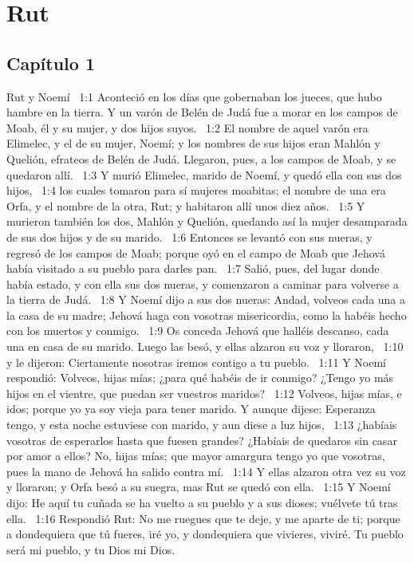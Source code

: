 \chapter{Rut}

\section*{Capítulo 1}

Rut y Noemí  
1:1 Aconteció en los días que gobernaban los jueces, que hubo hambre en la tierra. Y un varón de Belén de Judá fue a morar en los campos de Moab, él y su mujer, y dos hijos suyos.  
1:2 El nombre de aquel varón era Elimelec, y el de su mujer, Noemí; y los nombres de sus hijos eran Mahlón y Quelión, efrateos de Belén de Judá. Llegaron, pues, a los campos de Moab, y se quedaron allí.  
1:3 Y murió Elimelec, marido de Noemí, y quedó ella con sus dos hijos,  
1:4 los cuales tomaron para sí mujeres moabitas; el nombre de una era Orfa, y el nombre de la otra, Rut; y habitaron allí unos diez años.  
1:5 Y murieron también los dos, Mahlón y Quelión, quedando así la mujer desamparada de sus dos hijos y de su marido.  
1:6 Entonces se levantó con sus nueras, y regresó de los campos de Moab; porque oyó en el campo de Moab que Jehová había visitado a su pueblo para darles pan.  
1:7 Salió, pues, del lugar donde había estado, y con ella sus dos nueras, y comenzaron a caminar para volverse a la tierra de Judá.  
1:8 Y Noemí dijo a sus dos nueras: Andad, volveos cada una a la casa de su madre; Jehová haga con vosotras misericordia, como la habéis hecho con los muertos y conmigo.  
1:9 Os conceda Jehová que halléis descanso, cada una en casa de su marido. Luego las besó, y ellas alzaron su voz y lloraron,  
1:10 y le dijeron: Ciertamente nosotras iremos contigo a tu pueblo.  
1:11 Y Noemí respondió: Volveos, hijas mías; ¿para qué habéis de ir conmigo? ¿Tengo yo más hijos en el vientre, que puedan ser vuestros maridos?  
1:12 Volveos, hijas mías, e idos; porque yo ya soy vieja para tener marido. Y aunque dijese: Esperanza tengo, y esta noche estuviese con marido, y aun diese a luz hijos,  
1:13 ¿habíais vosotras de esperarlos hasta que fuesen grandes? ¿Habíais de quedaros sin casar por amor a ellos? No, hijas mías; que mayor amargura tengo yo que vosotras, pues la mano de Jehová ha salido contra mí.  
1:14 Y ellas alzaron otra vez su voz y lloraron; y Orfa besó a su suegra, mas Rut se quedó con ella.  
1:15 Y Noemí dijo: He aquí tu cuñada se ha vuelto a su pueblo y a sus dioses; vuélvete tú tras ella.  
1:16 Respondió Rut: No me ruegues que te deje, y me aparte de ti; porque a dondequiera que tú fueres, iré yo, y dondequiera que vivieres, viviré. Tu pueblo será mi pueblo, y tu Dios mi Dios.  
